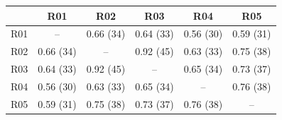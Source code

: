 \begin{tabular}{@{}lccccc@{}}
\toprule
 & \textbf{R01} & \textbf{R02} & \textbf{R03} & \textbf{R04} & \textbf{R05} \\
\midrule
R01 & -- & 0.66 (34) & 0.64 (33) & 0.56 (30) & 0.59 (31) \\
R02 & 0.66 (34) & -- & 0.92 (45) & 0.63 (33) & 0.75 (38) \\
R03 & 0.64 (33) & 0.92 (45) & -- & 0.65 (34) & 0.73 (37) \\
R04 & 0.56 (30) & 0.63 (33) & 0.65 (34) & -- & 0.76 (38) \\
R05 & 0.59 (31) & 0.75 (38) & 0.73 (37) & 0.76 (38) & -- \\
\bottomrule
\end{tabular}
